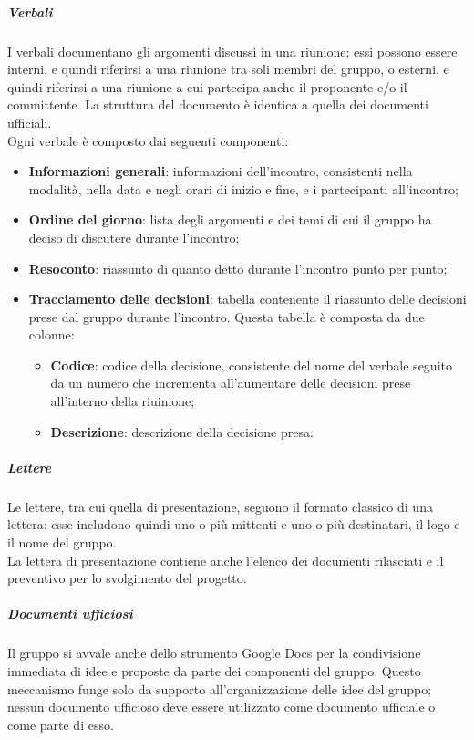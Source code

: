 \documentclass[../norme-di-progetto.tex]{subfiles}
\begin{document}
\subparagraph*{Verbali}
I verbali documentano gli argomenti discussi in una riunione; essi possono essere interni, e quindi riferirsi a una riunione tra soli membri del gruppo, o esterni, e quindi riferirsi a una riunione a cui partecipa anche il proponente e/o il committente. La struttura del documento è identica a quella dei documenti ufficiali. \\
Ogni verbale è composto dai seguenti componenti:
\begin{itemize}
  \item \textbf{Informazioni generali}: informazioni dell'incontro, consistenti nella modalità, nella data e negli orari di inizio e fine, e i partecipanti all'incontro;
  \item \textbf{Ordine del giorno}: lista degli argomenti e dei temi di cui il gruppo ha deciso di discutere durante l'incontro;
  \item \textbf{Resoconto}: riassunto di quanto detto durante l'incontro punto per punto;
  \item \textbf{Tracciamento delle decisioni}: tabella contenente il riassunto delle decisioni prese dal gruppo durante l'incontro. Questa tabella è composta da due colonne:
  \begin{itemize}
    \item \textbf{Codice}: codice della decisione, consistente del nome del verbale seguito da un numero che incrementa all'aumentare delle decisioni prese all'interno della riuinione;
    \item \textbf{Descrizione}: descrizione della decisione presa.
  \end{itemize}
\end{itemize}

\subparagraph*{Lettere}
Le lettere, tra cui quella di presentazione, seguono il formato classico di una lettera: esse includono quindi uno o più mittenti e uno o più destinatari, il logo e il nome del gruppo. \\
La lettera di presentazione contiene anche l'elenco dei documenti rilasciati e il preventivo per lo svolgimento del progetto.

\subparagraph*{Documenti ufficiosi}
Il gruppo si avvale anche dello strumento Google Docs per la condivisione immediata di idee e proposte da parte dei componenti del gruppo. Questo meccanismo funge solo da supporto all'organizzazione delle idee del gruppo; nessun documento ufficioso deve essere utilizzato come documento ufficiale o come parte di esso.
\end{document}
